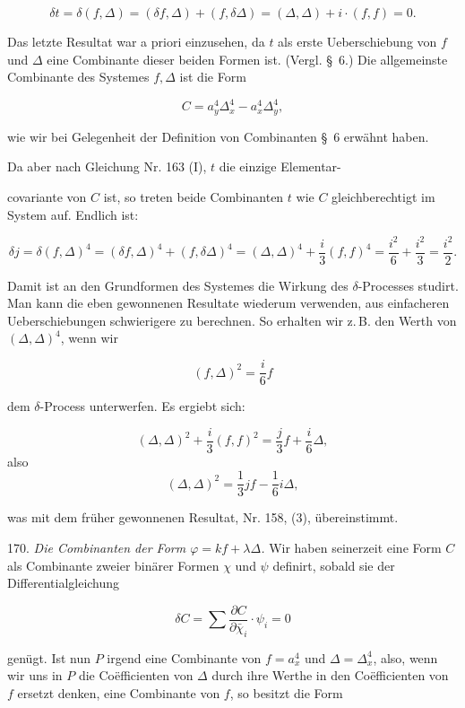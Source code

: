 \documentclass[11pt]{article}
\providecommand{\weberpage}[1]{}
\providecommand{\weq}[2]{\begin{equation}\tag{#1}#2\end{equation}}
\let\Delta\varDelta
\begin{document}
\weq{4}{\delta t = \delta(f,\Delta) = (\delta f,\Delta)+(f,\delta\Delta) = (\Delta,\Delta)+i\cdot(f,f) = 0.}

Das letzte Resultat war a priori einzusehen, da $t$ als erste Ueberschiebung von $f$ und $\Delta$ eine Combinante dieser beiden Formen ist. (Vergl. \S~6.) Die allgemeinste Combinante des Systemes $f, \Delta$ ist die Form

\[
C = a_y^4\Delta_x^4 - a_x^4\Delta_y^4,
\]

wie wir bei Gelegenheit der Definition von Combinanten \S~6 erwähnt haben.

Da aber nach Gleichung Nr. 163 (I), $t$ die einzige Elementar-


\weberpage{188}

covariante von $C$ ist, so treten beide Combinanten $t$ wie $C$ gleichberechtigt im System auf. Endlich ist:

\weq{5}{\delta j = \delta(f,\Delta)^4 = (\delta f,\Delta)^4+(f,\delta\Delta)^4 = (\Delta,\Delta)^4+\frac{i}{3}(f,f)^4 = \frac{i^2}{6}+\frac{i^2}{3} = \frac{i^2}{2}.}

Damit ist an den Grundformen des Systemes die Wirkung des $\delta$-Processes studirt. Man kann die eben gewonnenen Resultate wiederum verwenden, aus einfacheren Ueberschiebungen schwierigere zu berechnen. So erhalten wir z.\,B. den Werth von $(\Delta,\Delta)^4$, wenn wir

\[
(f,\Delta)^2 = \frac{i}{6}f
\]

dem $\delta$-Process unterwerfen. Es ergiebt sich:

\[
(\Delta,\Delta)^2 + \frac{i}{3}(f,f)^2 = \frac{j}{3}f + \frac{i}{6}\Delta,
\]
also
\[
(\Delta,\Delta)^2 = \frac{1}{3}jf - \frac{1}{6}i\Delta,
\]

was mit dem früher gewonnenen Resultat, Nr. 158, (3), übereinstimmt.

170. \textit{Die Combinanten der Form $\varphi=kf+\lambda\Delta$.} Wir haben seinerzeit eine Form $C$ als Combinante zweier binärer Formen $\chi$ und $\psi$ definirt, sobald sie der Differentialgleichung

\[
\delta C = \sum \frac{\partial C}{\partial \bar\chi_i}\cdot \psi_i = 0
\]

genügt. Ist nun $P$ irgend eine Combinante von $f=a_x^4$ und $\Delta=\Delta_x^4$, also, wenn wir uns in $P$ die Co\"efficienten von $\Delta$ durch ihre Werthe in den Co\"efficienten von $f$ ersetzt denken, eine Combinante von $f$, so besitzt die Form
\end{document}
